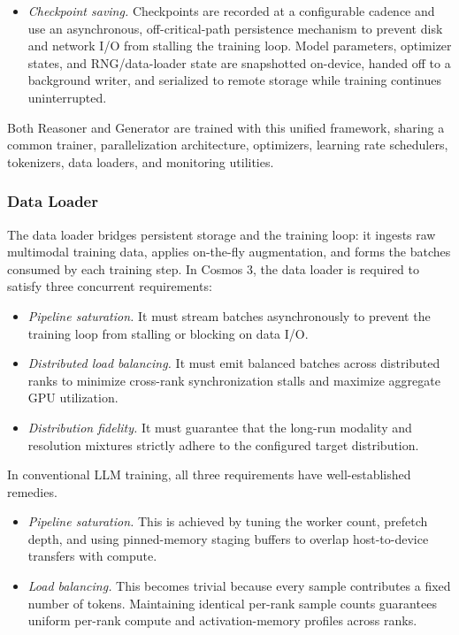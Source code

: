 \begin{itemize}
    \item \textit{Checkpoint saving.} Checkpoints are recorded at a configurable cadence and use an asynchronous, off-critical-path persistence mechanism to prevent disk and network I/O from stalling the training loop. Model parameters, optimizer states, and RNG/data-loader state are snapshotted on-device, handed off to a background writer, and serialized to remote storage while training continues uninterrupted.
\end{itemize}

Both Reasoner and Generator are trained with this unified framework, sharing a common trainer, parallelization architecture, optimizers, learning rate schedulers, tokenizers, data loaders, and monitoring utilities.

\subsubsection{Data Loader}
\label{sec::data-loader}

The data loader bridges persistent storage and the training loop: it ingests raw multimodal training data, applies on-the-fly augmentation, and forms the batches consumed by each training step. In Cosmos 3, the data loader is required to satisfy three concurrent requirements:
\begin{itemize}
    \item \textit{Pipeline saturation.} It must stream batches asynchronously to prevent the training loop from stalling or blocking on data I/O.
    \item \textit{Distributed load balancing.} It must emit balanced batches across distributed ranks to minimize cross-rank synchronization stalls and maximize aggregate GPU utilization.
    \item \textit{Distribution fidelity.} It must guarantee that the long-run modality and resolution mixtures strictly adhere to the configured target distribution.
\end{itemize}

In conventional LLM training, all three requirements have well-established remedies.
\begin{itemize}
  \item \textit{Pipeline saturation.} This is achieved by tuning the worker count, prefetch depth, and using pinned-memory staging buffers to overlap host-to-device transfers with compute.
  \item \textit{Load balancing.} This becomes trivial because every sample contributes a fixed number of tokens. Maintaining identical per-rank sample counts guarantees uniform per-rank compute and activation-memory profiles across ranks.
\end{itemize}

